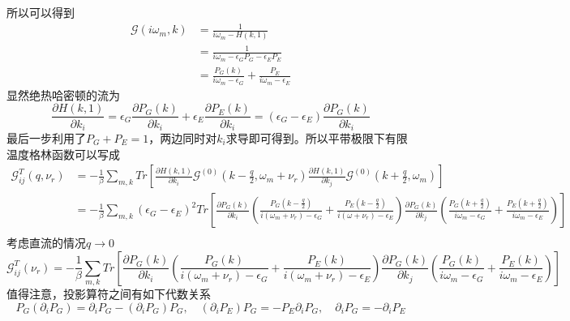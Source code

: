 \documentclass{article}
\numberwithin{equation}{subsection}
\begin{document}
所以可以得到
\begin{equation}
    \begin{split}
        \mathcal{G}(i\omega_m,k)&=\frac{1}{i\omega_m-H(k,1)}\\
        &=\frac{1}{i\omega_m-\epsilon_GP_G-\epsilon_EP_E}\\
        &=\frac{P_G(k)}{i\omega_m-\epsilon_G}+\frac{P_E}{i\omega_m-\epsilon_E}
    \end{split}
\end{equation}
显然绝热哈密顿的流为
\begin{equation}
    \frac{\partial H(k,1)}{\partial k_i}=\epsilon_G\frac{\partial P_G(k)}{\partial k_i}+\epsilon_E\frac{\partial P_E(k)}{\partial k_i}=(\epsilon_G-\epsilon_E)\frac{\partial P_G(k)}{\partial k_i}
\end{equation}
最后一步利用了$P_G+P_E=1$，两边同时对$k_i$求导即可得到。所以平带极限下有限温度格林函数可以写成
\begin{equation}
    \begin{split}
        \mathcal{G}_{ij}^T(q,\nu_r)&=-\frac{1}{\beta}\sum_{m,k}Tr\left[\frac{\partial H(k,1)}{\partial k_i}\mathcal{G}^{(0)}(k-\frac{q}{2},\omega_m+\nu_r)\frac{\partial H(k,1)}{\partial k_j}\mathcal{G}^{(0)}(k+\frac{q}{2},\omega_m)\right]\\
        &=-\frac{1}{\beta}\sum_{m,k}(\epsilon_G-\epsilon_E)^2Tr\left[\frac{\partial P_G(k)}{\partial k_i}(\frac{P_G(k-\frac{q}{2})}{i(\omega_m+\nu_r)-\epsilon_G}+\frac{P_E(k-\frac{q}{2})}{i(\omega+\nu_r)-\epsilon_E})\frac{\partial P_G(k)}{\partial k_j}(\frac{P_G(k+\frac{q}{2})}{i\omega_m-\epsilon_G}+\frac{P_E(k+\frac{q}{2})}{i\omega_m-\epsilon_E})\right]\\
    \end{split}
\end{equation}
考虑直流的情况$q\to0$
\begin{equation}
    \mathcal{G}_{ij}^T(\nu_r)=-\frac{1}{\beta}\sum_{m,k}Tr\left[\frac{\partial P_G(k)}{\partial k_i}(\frac{P_G(k)}{i(\omega_m+\nu_r)-\epsilon_G}+\frac{P_E(k)}{i(\omega_m+\nu_r)-\epsilon_E})\frac{\partial P_G(k)}{\partial k_j}(\frac{P_G(k)}{i\omega_m-\epsilon_G}+\frac{P_E(k)}{i\omega_m-\epsilon_E})\right]
\end{equation}
值得注意，投影算符之间有如下代数关系
\begin{equation}
    P_{G}\left(\partial_{i} P_{G}\right)=\partial_{i} P_{G}-\left(\partial_{i} P_{G}\right) P_{G}, \quad\left(\partial_{i} P_{E}\right) P_{G}=-P_{E} \partial_{i} P_{G}, \quad \partial_{i} P_{G}=-\partial_{i} P_{E}
\end{equation}
\end{document}

